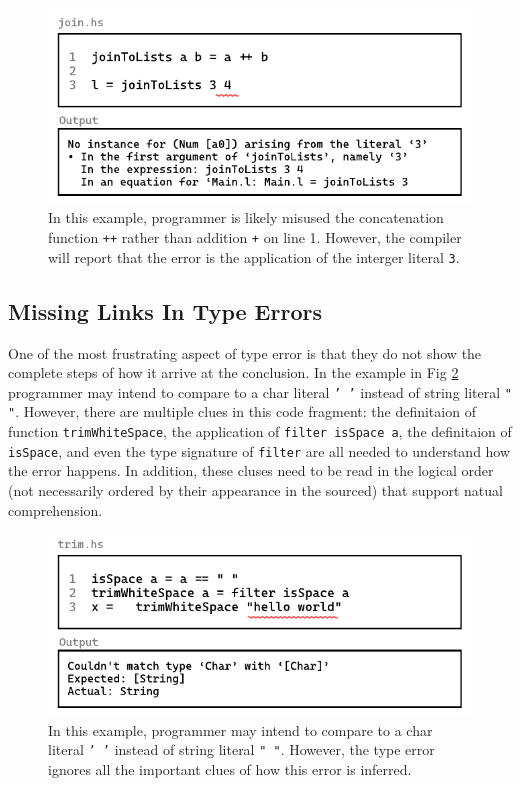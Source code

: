\begin{figure}[hbt]
  \includegraphics[width=\linewidth]{TypeErrorExample2}
  \caption{
    \label{fig:type-error-example-2}
  In this example, programmer is likely misused the concatenation function \texttt{++} rather than addition \texttt{+} on line 1. However, the compiler will report that the error is the application of the interger literal \texttt{3}.
    }
\end{figure}

\subsection{Missing Links In Type Errors}
\label{subsec:missing-link}

One of the most frustrating aspect of type error is that they do not show the complete steps of how it arrive at the conclusion. In the example in Fig \ref{fig:type-error-example-3}  programmer may intend to compare to a char literal \texttt{' '} instead of string literal \texttt{" "}. However, there are multiple clues in this code fragment: the definitaion of function \texttt{trimWhiteSpace}, the application of \texttt{filter isSpace a}, the definitaion of \texttt{isSpace}, and even the type signature of \texttt{filter} are all needed to understand how the error happens. In addition, these cluses need to be read in the logical order (not necessarily ordered by their appearance in the sourced) that support natual comprehension. 


\begin{figure}[hbt]
  \includegraphics[width=\linewidth]{TypeErrorExample3}
  \caption{
    \label{fig:type-error-example-3}
  In this example, programmer may intend to compare to a char literal \texttt{' '} instead of string literal \texttt{" "}. However, the type error ignores all the important clues of how this error is inferred. 
    }
\end{figure}


